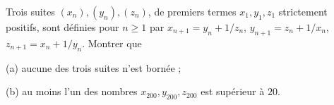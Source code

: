 Trois suites $(x_n), (y_n), (z_n)$, de premiers termes $x_1, y_1, z_1$ strictement positifs, sont définies pour $n \geq 1$ par $x_{n+1} = y_n + 1/z_n$, $y_{n+1} = z_n + 1/x_n$, $z_{n+1} = x_n + 1/y_n$. Montrer que

(a) aucune des trois suites n'est bornée ;

(b) au moins l'un des nombres $x_{200}, y_{200}, z_{200}$ est supérieur à $20$.
